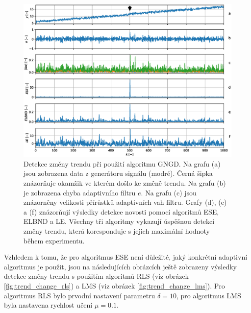 \begin{figure}[ht!]

    \centering
    \includegraphics[scale=0.60]{IMG/mdpi/trendchange.eps}
    \caption{Detekce změny trendu při použití algoritmu GNGD. Na grafu (a) jsou zobrazena data z generátoru signálu (modré). Černá šipka znázorňuje okamžik ve kterém došlo ke změně trendu. Na grafu (b) je zobrazena chyba adaptivního filtru $e$. Na grafu (c) jsou znázorněny velikosti přírůstků adaptivních vah filtru. Grafy (d), (e) a (f) znázorňují výsledky detekce novosti pomocí algoritmů ESE, ELBND a LE. Všechny tři algoritmy vykazují úspěšnou detekci změny trendu, která koresponduje s jejich maximální hodnoty během experimentu.}
\label{fig:trend_change}
\end{figure}
\par
Vzhledem k tomu, že pro algoritmus ESE není důležité, jaký konkrétní adaptivní algoritmus je použit, jsou na následujících obrázcích ještě zobrazeny výsledky detekce změny trendu s použitím algoritmů RLS (viz obrázek \ref{fig:trend_change_rls}) a LMS (viz obrázek \ref{fig:trend_change_lms}). Pro algoritmus RLS bylo prvodní nastavení parametru $\delta=10$, pro algoritmus LMS byla nastavena rychlost učení $\mu=0.1$.

